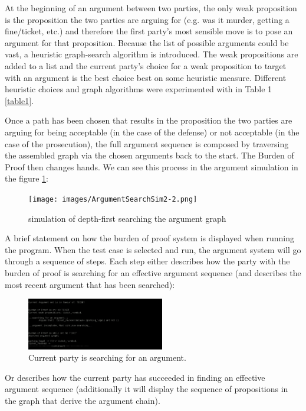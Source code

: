 \documentclass[10pt,a4paper,twocolumn]{article}
\begin{document}
At the beginning of an argument between two parties, the only weak
proposition is the proposition the two parties are arguing for (e.g. was it murder,
getting a fine/ticket, etc.) and therefore the first party's most sensible move is to
pose an argument for that proposition. Because the list of possible arguments
could be vast, a heuristic graph-search algorithm is introduced. The weak propositions
are added to a list and the current party's choice for a weak proposition
to target with an argument is the best choice best on some heuristic measure.
Different heuristic choices and graph algorithms were experimented with in Table
1 \ref{table1}.

Once a path has been chosen that results in the
proposition the two parties are arguing for being acceptable (in the case of the defense) or not
acceptable (in the case of the prosecution), the full argument sequence is
composed by traversing the assembled graph via the chosen arguments back to the start.
The Burden of Proof then changes hands. We can see this process in the argument
simulation in the figure \ref{simOfHeuristics}:

\begin{figure}[h!]
	\label{simOfHeuristics}
	\texttt{[image: images/ArgumentSearchSim2-2.png]}
	\centering
	\caption{simulation of depth-first searching the argument graph}
\end{figure}

A brief statement on how the burden of proof system is displayed when running
the program. When the test case is selected and run, the argument system will go
through a sequence of steps. Each step either describes how the party with the
burden of proof is searching for an effective argument sequence (and describes
the most recent argument that has been searched):

\begin{figure}[h!]
	\label{screen1}
	\includegraphics[width=6cm]{images/screeen1.png}
	\centering
	\caption{Current party is searching for an argument.}
\end{figure}

Or describes how the current party has succeeded in finding an effective
argument sequence (additionally it will display the sequence of propositions in the graph
that derive the argument chain).
\end{document}
